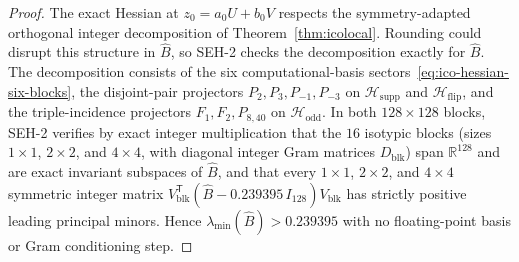 \begin{proof}
The exact Hessian at \(z_0=a_0U+b_0V\) respects the symmetry-adapted orthogonal integer decomposition of Theorem~\ref{thm:icolocal}.
Rounding could disrupt this structure in \(\widehat B\), so SEH-2 checks the decomposition exactly for \(\widehat B\). The decomposition consists of the six computational-basis sectors~\eqref{eq:ico-hessian-six-blocks}, the disjoint-pair projectors \(P_2,P_3,P_{-1},P_{-3}\) on \(\mathcal H_{\mathrm{supp}}\) and \(\mathcal H_{\mathrm{flip}}\), and the triple-incidence projectors \(F_1,F_2,P_{8,40}\) on \(\mathcal H_{\mathrm{odd}}\). In both \(128\times128\) blocks, SEH-2 verifies by exact integer multiplication that the \(16\) isotypic blocks (sizes \(1\times1\), \(2\times2\), and \(4\times4\), with diagonal integer Gram matrices \(D_{\mathrm{blk}}\)) span \(\mathbb R^{128}\) and are exact invariant subspaces of \(\widehat B\), and that every \(1\times1\), \(2\times2\), and \(4\times4\) symmetric integer matrix \(V_{\mathrm{blk}}^{\mathsf T}(\widehat B-0.239395\,I_{128})V_{\mathrm{blk}}\) has strictly positive leading principal minors. Hence \(\lambda_{\min}(\widehat B)>0.239395\) with no floating-point basis or Gram conditioning step.


\end{proof}
